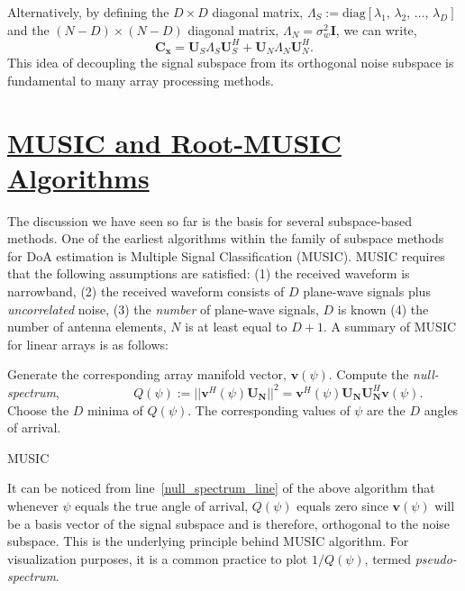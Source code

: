 \documentclass[a4paper, 11pt]{article}
\begin{document}
Alternatively, by defining the $D\times D$ diagonal matrix, $\Lambda_S := \mathrm{diag}\left[\lambda_1,\,\lambda_2,\,\hdots,\,\lambda_D\right]$ and the $(N-D)\times(N-D)$ diagonal matrix, $\Lambda_N=\sigma_w^2\mathbf{I}$, we can write, 
\begin{equation}
\mathbf{C_x} = \mathbf{U}_S\Lambda_S\mathbf{U}_S^H+\mathbf{U}_N\Lambda_N\mathbf{U}_N^H.
\end{equation}
This idea of decoupling the signal subspace from its orthogonal noise subspace is fundamental to many array processing methods.

\section*{\underline{MUSIC and Root-MUSIC Algorithms}}
The discussion we have seen so far is the basis for several subspace-based methods. One of the earliest algorithms within the family of subspace methods for DoA estimation is Multiple Signal Classification (MUSIC). MUSIC requires that the following assumptions are satisfied: (1) the received waveform is narrowband, (2) the received waveform consists of $D$ plane-wave signals plus \textit{uncorrelated} noise, (3) the \textit{number} of plane-wave signals, $D$ is known (4) the number of antenna elements, $N$ is at least equal to $D+1$. A summary of MUSIC for linear arrays is as follows:
\begin{algorithm}[H]
\renewcommand{\thealgorithm}{}
\begin{algorithmic}[1]
\State {}
\State {}
\State Generate the corresponding array manifold vector, $\mathbf{v}(\psi)$.  
\State Compute the \textit{null-spectrum}, \label{null_spectrum_line}
\Statex $\phantom{indentation}$ $Q(\psi) := ||\mathbf{v}^H(\psi)\mathbf{U_N}||^2 = \mathbf{v}^H(\psi)\mathbf{U_N}\mathbf{U}^H_\mathbf{N}\mathbf{v}(\psi)$.
\EndFor
\State Choose the $D$ minima of $Q(\psi)$. The corresponding values of $\psi$ are the $D$ angles of arrival. 
\end{algorithmic}
\caption{MUSIC}
\end{algorithm}
It can be noticed from line~\ref{null_spectrum_line} of the above algorithm that whenever $\psi$ equals the true angle of arrival, $Q(\psi)$ equals zero since $\mathbf{v}(\psi)$ will be a basis vector of the signal subspace and is therefore, orthogonal to the noise subspace. This is the underlying principle behind MUSIC algorithm. For visualization purposes, it is a common practice to plot $1/Q(\psi)$, termed \textit{pseudo-spectrum}. 
\end{document}
